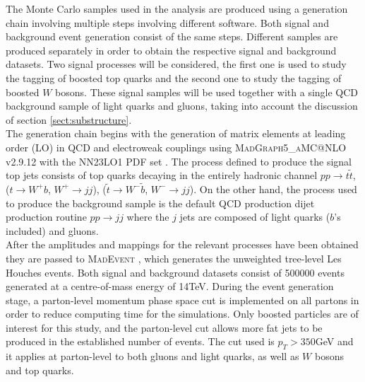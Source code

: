 \documentclass[main]{subfiles} %
\begin{document}


\doublespacing


\vspace{20pt}

The Monte Carlo samples used in the analysis are produced using a generation chain involving multiple steps involving different software. Both signal and background event generation consist of the same steps. Different samples are produced separately in order to obtain the respective signal and background datasets. Two signal processes will be considered, the first one is used to study the tagging of boosted top quarks and the second one to study the tagging of boosted $W$ bosons. These signal samples will be used together with a single QCD background sample of light quarks and gluons, taking into account the discussion of section \ref{sect:substructure}.\\


The generation chain begins with the generation of matrix elements at leading order (LO) in QCD and electroweak couplings using \textsc{MadGraph5\_aMC@NLO} v2.9.12 \cite{Alwall2014} with the \textsc{NN23LO1} PDF set \cite{Ball2017}. The process defined to produce the signal top jets consists of top quarks decaying in the entirely hadronic channel $pp \rightarrow t \tilde{t}$, ($t \rightarrow W^+ b$, $W^+ \rightarrow jj$), ($\tilde{t} \rightarrow W^- \tilde{b}$, $W^- \rightarrow jj$). On the other hand, the process used to produce the background sample is the default QCD production dijet production routine $pp \rightarrow jj$ where the $j$ jets are composed of light quarks ($b$'s included) and gluons.\\

After the amplitudes and mappings for the relevant processes have been obtained they are passed to \textsc{MadEvent} \cite{Maltoni2003}, which generates the unweighted tree-level Les Houches events. Both signal and background datasets consist of 500000 events generated at a centre-of-mass energy of 14\;TeV. During the event generation stage, a parton-level momentum phase space cut is implemented on all partons in order to reduce computing time for the simulations. Only boosted particles are of interest for this study, and the parton-level cut allows more fat jets to be produced in the established number of events. The cut used is $p_T > 350$\;GeV and it applies at parton-level to both gluons and light quarks, as well as $W$ bosons and top quarks. \\
\end{document}
